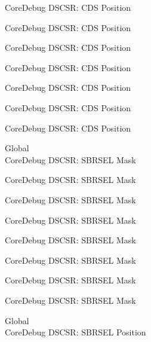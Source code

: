 \begin{DoxyRefList}
\label{deprecated__deprecated000147}%
%
Core\+Debug DSCSR\+: CDS Position 

\label{deprecated__deprecated000223}%
%
Core\+Debug DSCSR\+: CDS Position 

\label{deprecated__deprecated000286}%
%
Core\+Debug DSCSR\+: CDS Position 

\label{deprecated__deprecated000365}%
%
Core\+Debug DSCSR\+: CDS Position 

\label{deprecated__deprecated000441}%
%
Core\+Debug DSCSR\+: CDS Position 

\label{deprecated__deprecated000544}%
%
Core\+Debug DSCSR\+: CDS Position 

\label{deprecated__deprecated000646}%
%
Core\+Debug DSCSR\+: CDS Position  
\item[Global \doxylink{group___c_m_s_i_s___s_c_b_gaaffe28a24f05446e55ba3d75bb6f4cd0}{Core\+Debug\+\_\+\+DSCSR\+\_\+\+SBRSEL\+\_\+\+Msk} ]\hfill \\
\label{deprecated__deprecated000096}%
%
Core\+Debug DSCSR\+: SBRSEL Mask 

\label{deprecated__deprecated000150}%
%
Core\+Debug DSCSR\+: SBRSEL Mask 

\label{deprecated__deprecated000226}%
%
Core\+Debug DSCSR\+: SBRSEL Mask 

\label{deprecated__deprecated000289}%
%
Core\+Debug DSCSR\+: SBRSEL Mask 

\label{deprecated__deprecated000368}%
%
Core\+Debug DSCSR\+: SBRSEL Mask 

\label{deprecated__deprecated000444}%
%
Core\+Debug DSCSR\+: SBRSEL Mask 

\label{deprecated__deprecated000547}%
%
Core\+Debug DSCSR\+: SBRSEL Mask 

\label{deprecated__deprecated000649}%
%
Core\+Debug DSCSR\+: SBRSEL Mask  
\item[Global \doxylink{group___c_m_s_i_s___s_c_b_ga7450603163415ab4d4e4a7a767879eae}{Core\+Debug\+\_\+\+DSCSR\+\_\+\+SBRSEL\+\_\+\+Pos} ]\hfill \\
\label{deprecated__deprecated000095}%
%
Core\+Debug DSCSR\+: SBRSEL Position 


\end{DoxyRefList}
